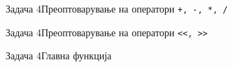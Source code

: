 \begin{frame}[fragile]{Задача 4}{Преоптоварување на оператори
\texttt{+, -, *, /}}

\end{frame}

\begin{frame}[fragile]{Задача 4}{Преоптоварување на оператори
\texttt{<<, >>}}

\end{frame}

\begin{frame}[fragile]{Задача 4}{Главна функција}

\end{frame}
